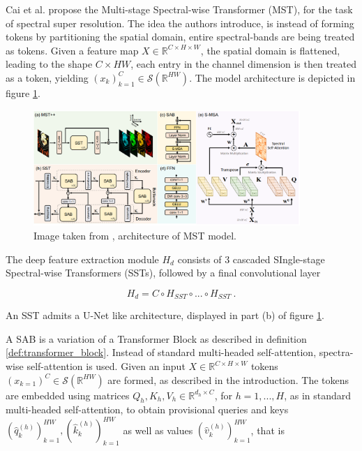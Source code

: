 Cai et al. \cite{caiMSTMultistageSpectralwise2022a} propose the Multi-stage Spectral-wise Transformer (MST),
for the task of spectral super resolution.
The idea the authors introduce, is instead of forming tokens by partitioning the spatial domain,
entire spectral-bands are being treated as tokens.
Given a feature map $X \in \mathbb R^{C \times H \times W}$, the spatial domain is flattened,
leading to the shape $C \times HW$,
each entry in the channel dimension is then treated as a token, 
yielding $(x_k)_{k=1}^{C} \in \mathcal S( \mathbb R^{HW})$.
The model architecture is depicted in figure \ref{fig:mst}.

\begin{figure}[h!]
    \includegraphics[width=0.9\textwidth]{models/ssr/imgs/mst.png}
    \caption{Image taken from \cite{caiMSTMultistageSpectralwise2022a}, architecture of MST model.}
    \label{fig:mst}
\end{figure}

The deep feature extraction module $H_d$ consists of $3$ cascaded SIngle-stage Spectral-wise Transformers (SSTs),
followed by a final convolutional layer

    $$ H_d = C \circ H_{SST} \circ ... \circ H_{SST} ~. $$

An SST admits a U-Net like architecture, displayed in part (b) of figure \ref{fig:mst}.

A SAB is a variation of a Transformer Block as described in definition \ref{def:transformer_block}.
Instead of standard multi-headed self-attention, spectra-wise self-attention is used.
Given an input $X \in \mathbb R^{C \times H \times W}$ tokens $(x_{k = 1})^C \in \mathcal S (\mathbb R^{HW})$ are formed,
as described in the introduction.
The tokens are embedded using matrices $Q_h, K_h, V_h \in \mathbb R^{d_h \times C}$,
for $h = 1, ..., H$, as in standard multi-headed self-attention, 
to obtain provisional queries and keys $(\hat{q}_k^{(h)})_{k=1}^{HW}, (\hat{k}_k^{(h)})_{k=1}^{HW}$ 
as well as values $(\hat{v}_k^{(h)})_{k=1}^{HW}$, that is

